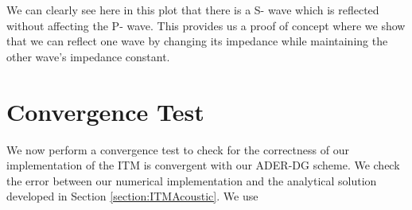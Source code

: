 We can clearly see here in this plot that there is a S- wave which is reflected without affecting the P- wave. 
This provides us a proof of concept where we show that we can reflect one wave by changing its impedance while maintaining the other wave's impedance constant. \\

\section{Convergence Test}
We now perform a convergence test to check for the correctness of our implementation of the \ac{ITM} is convergent with our \ac{ADER}-\ac{DG} scheme. 
We check the error between our numerical implementation and the analytical solution developed in Section \ref{section:ITMAcoustic}. We use
